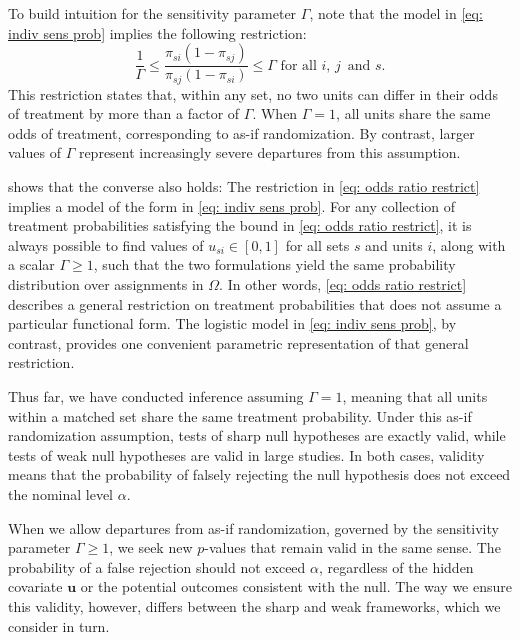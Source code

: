 \documentclass[
  12pt,
  leqno]{article}
\begin{document}
To build intuition for the sensitivity parameter \(\Gamma\), note that
the model in \eqref{eq: indiv sens prob} implies the following
restriction: \begin{equation} \label{eq: odds ratio restrict}
\frac{1}{\Gamma} \leq \frac{\pi_{si}\left(1 - \pi_{sj}\right)}{\pi_{sj}\left(1 - \pi_{si}\right)} \leq \Gamma \text{ for all } i, \, j \, \text{ and } s.
\end{equation} This restriction states that, within any set, no two
units can differ in their odds of treatment by more than a factor of
\(\Gamma\). When \(\Gamma = 1\), all units share the same odds of
treatment, corresponding to as-if randomization. By contrast, larger
values of \(\Gamma\) represent increasingly severe departures from this
assumption.

\citet[pp.~1424--1425]{rosenbaum1995a} shows that the converse also
holds: The restriction in \eqref{eq: odds ratio restrict} implies a
model of the form in \eqref{eq: indiv sens prob}. For any collection of
treatment probabilities satisfying the bound in
\eqref{eq: odds ratio restrict}, it is always possible to find values of
\(u_{si} \in [0,1]\) for all sets \(s\) and units \(i\), along with a
scalar \(\Gamma \geq 1\), such that the two formulations yield the same
probability distribution over assignments in \(\Omega\). In other words,
\eqref{eq: odds ratio restrict} describes a general restriction on
treatment probabilities that does not assume a particular functional
form. The logistic model in \eqref{eq: indiv sens prob}, by contrast,
provides one convenient parametric representation of that general
restriction.

Thus far, we have conducted inference assuming \(\Gamma = 1\), meaning
that all units within a matched set share the same treatment
probability. Under this as-if randomization assumption, tests of sharp
null hypotheses are exactly valid, while tests of weak null hypotheses
are valid in large studies. In both cases, validity means that the
probability of falsely rejecting the null hypothesis does not exceed the
nominal level \(\alpha\).

When we allow departures from as-if randomization, governed by the
sensitivity parameter \(\Gamma \geq 1\), we seek new \(p\)-values that
remain valid in the same sense. The probability of a false rejection
should not exceed \(\alpha\), regardless of the hidden covariate
\(\mathbf{u}\) or the potential outcomes consistent with the null. The
way we ensure this validity, however, differs between the sharp and weak
frameworks, which we consider in turn.
\end{document}
